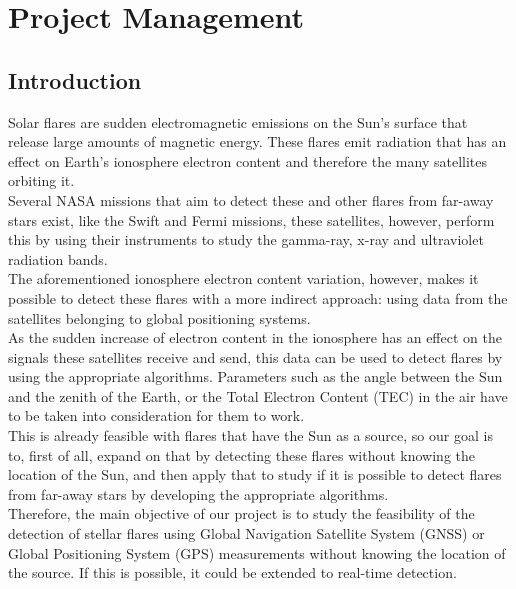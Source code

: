 \chapter{Project Management}


\section{Introduction}

Solar flares are sudden electromagnetic emissions on the Sun’s surface that release large amounts of magnetic energy. These flares emit radiation that has an effect on Earth’s ionosphere electron content and therefore the many satellites orbiting it. \cite{hernandez2012gnss}\\

Several NASA missions that aim to detect these and other flares from far-away stars exist, like the Swift and Fermi missions, these satellites, however, perform this by using their instruments to study the gamma-ray, x-ray and ultraviolet radiation bands. \cite{gehrels2013gamma}\\

The aforementioned ionosphere electron content variation, however, makes it possible to detect these flares with a more indirect approach: using data from the satellites belonging to global positioning systems.\\

As the sudden increase of electron content in the ionosphere has an effect on the signals these satellites receive and send, this data can be used to detect flares by using the appropriate algorithms. Parameters such as the angle between the Sun and the zenith of the Earth, or the Total Electron Content (TEC) in the air have to be taken into consideration for them to work. \\

This is already feasible with flares that have the Sun as a source, so our goal is to, first of all, expand on that by detecting these flares without knowing the location of the Sun, and then apply that to study if it is possible to detect flares from far-away stars by developing the appropriate algorithms.\\

Therefore, the main objective of our project is to study the feasibility of the detection of stellar flares using Global Navigation Satellite System (GNSS) or Global Positioning System (GPS) measurements without knowing the location of the source. If this is possible, it could be extended to real-time detection.\\

